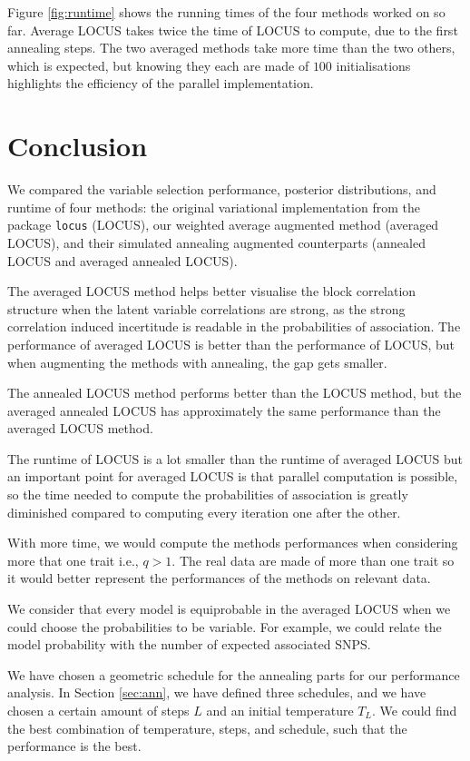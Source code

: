 \documentclass[a4paper, 11pt]{report}
\numberwithin{equation}{chapter}
\begin{document}
Figure \ref{fig:runtime} shows the running times of the four methods worked on so far. Average LOCUS takes twice the time of LOCUS to compute, due to the first annealing steps. The two averaged methods take more time than the two others, which is expected, but knowing they each are made of $100$ initialisations highlights the efficiency of the parallel implementation.
%
%
%
%
%
%
\newpage
\chapter{Conclusion}
We compared the variable selection performance, posterior distributions, and runtime of four methods: the original variational implementation from the package \texttt{locus} (LOCUS), our weighted average augmented method (averaged LOCUS), and their simulated annealing augmented counterparts (annealed LOCUS and averaged annealed LOCUS). 

The averaged LOCUS method helps better visualise the block correlation structure when the latent variable correlations are strong, as the strong correlation induced incertitude is readable in the probabilities of association. The performance of averaged LOCUS is better than the performance of LOCUS, but when augmenting the methods with annealing, the gap gets smaller.

The annealed LOCUS method performs better than the LOCUS method, but the averaged annealed LOCUS has approximately the same performance than the averaged LOCUS method. 

The runtime of LOCUS is a lot smaller than the runtime of averaged LOCUS but an important point for averaged LOCUS is that parallel computation is possible, so the time needed to compute the probabilities of association is greatly diminished compared to computing every iteration one after the other.

With more time, we would compute the methods performances when considering more that one trait i.e., $q > 1$. The real data are made of more than one trait so it would better represent the performances of the methods on relevant data.

We consider that every model is equiprobable in the averaged LOCUS when we could choose the probabilities to be variable. For example, we could relate the model probability with the number of expected associated SNPS.

We have chosen a geometric schedule for the annealing parts for our performance analysis. In Section \ref{sec:ann}, we have defined three schedules, and we have chosen a certain amount of steps $L$ and an initial temperature $T_L$. We could find the best combination of temperature, steps, and schedule, such that the performance is the best.
\end{document}
